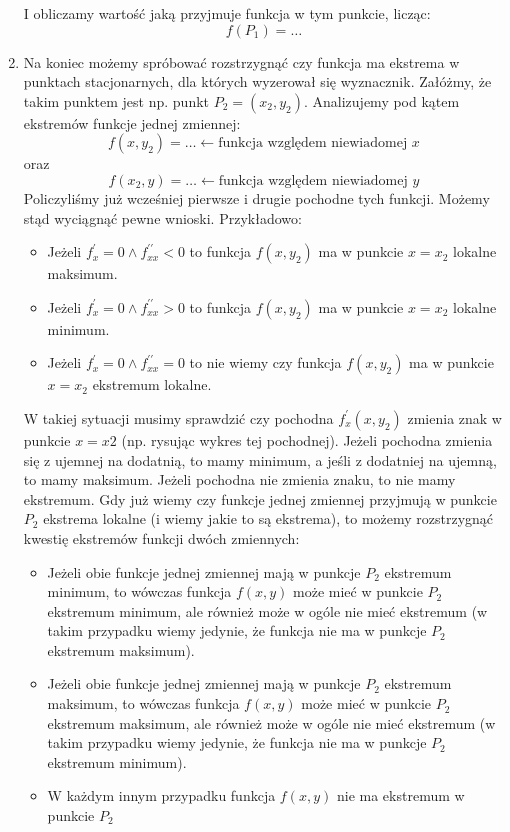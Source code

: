 \begin{enumerate}[itemsep=0pt,partopsep=0pt, parsep=0pt]
    I obliczamy wartość jaką przyjmuje funkcja w tym punkcie, licząc:
    \[
        f(P_1)= \dots
    \]
    \item Na koniec możemy spróbować rozstrzygnąć czy funkcja ma ekstrema w punktach stacjonarnych,
    dla których wyzerował się wyznacznik.
    Załóżmy, że takim punktem jest np. punkt $P_2=(x_2,y_2)$.
    Analizujemy pod kątem ekstremów funkcje jednej zmiennej:
    \[
        f(x,y_2)= \dots \leftarrow \text{funkcja względem niewiadomej $x$}
    \]
    oraz
    \[
        f(x_2,y)= \dots \leftarrow \text{funkcja względem niewiadomej $y$}
    \]
    Policzyliśmy już wcześniej pierwsze i drugie pochodne tych funkcji.
    Możemy stąd wyciągnąć pewne wnioski. Przykładowo:
    \begin{itemize}[itemsep=0pt,partopsep=0pt, parsep=0pt]
        \item Jeżeli $f^{\prime}_x=0 \land f^{\prime\prime}_{xx}<0$ to funkcja $f(x,y_2)$ ma w punkcie $x=x_2$ lokalne maksimum.
        \item Jeżeli $f^{\prime}_x=0 \land f^{\prime\prime}_{xx}>0$ to funkcja $f(x,y_2)$ ma w punkcie $x=x_2$ lokalne minimum.
        \item Jeżeli $f^{\prime}_x=0 \land f^{\prime\prime}_{xx}=0$ to nie wiemy czy funkcja $f(x,y_2)$
        ma w punkcie $x=x_2$ ekstremum lokalne.
    \end{itemize}
    W takiej sytuacji musimy sprawdzić czy pochodna $f^{\prime}_x(x,y_2)$ zmienia znak w punkcie $x=x2$
    (np. rysując wykres tej pochodnej).
    Jeżeli pochodna zmienia się z ujemnej na dodatnią, to mamy minimum, a jeśli z dodatniej na ujemną, to mamy maksimum.
    Jeżeli pochodna nie zmienia znaku, to nie mamy ekstremum.
    Gdy już wiemy czy funkcje jednej zmiennej przyjmują w punkcie $P_2$ ekstrema lokalne (i wiemy jakie to są ekstrema),
    to możemy rozstrzygnąć kwestię ekstremów funkcji dwóch zmiennych:
    \begin{itemize}[itemsep=0pt,partopsep=0pt, parsep=0pt]
        \item Jeżeli obie funkcje jednej zmiennej mają w punkcje $P_2$ ekstremum minimum, to wówczas funkcja $f(x,y)$
        może mieć w punkcie $P_2$ ekstremum minimum, ale również może w ogóle nie mieć ekstremum
        (w takim przypadku wiemy jedynie, że funkcja nie ma w punkcje $P_2$ ekstremum maksimum).
        \item Jeżeli obie funkcje jednej zmiennej mają w punkcje $P_2$ ekstremum maksimum, to wówczas funkcja $f(x,y)$
        może mieć w punkcie $P_2$ ekstremum maksimum, ale również może w ogóle nie mieć ekstremum
        (w takim przypadku wiemy jedynie, że funkcja nie ma w punkcje $P_2$ ekstremum minimum).
        \item W każdym innym przypadku funkcja $f(x,y)$ nie ma ekstremum w punkcie $P_2$
    \end{itemize}
\end{enumerate}
